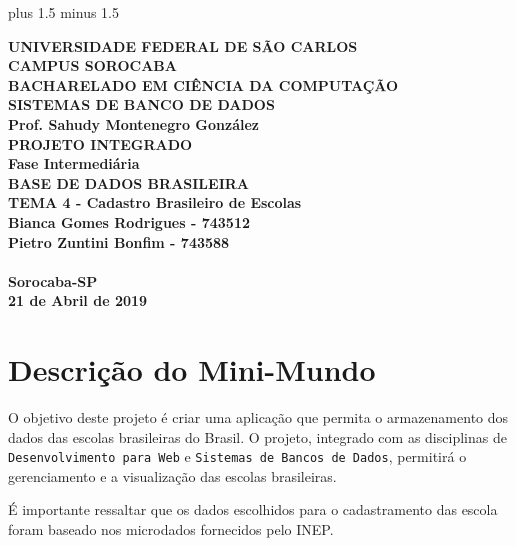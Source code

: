\documentclass[12pt,a4paper]{article}
\begin{document}
\font plus 1.5\font
minus 1.5\font

\begin{titlepage}

\begin{center}

\textbf{UNIVERSIDADE FEDERAL DE SÃO CARLOS\\CAMPUS SOROCABA\\\vspace{3cm} BACHARELADO EM CIÊNCIA DA COMPUTAÇÃO\\\vspace{3cm}SISTEMAS DE BANCO DE DADOS\\
Prof. Sahudy Montenegro González\\\vspace{3cm}
PROJETO INTEGRADO\\Fase Intermediária\\\vspace{0.5cm}
BASE DE DADOS BRASILEIRA\\TEMA 4 - Cadastro Brasileiro de Escolas \\\vspace{4.0cm}
Bianca Gomes Rodrigues - 743512\\
Pietro Zuntini Bonfim - 743588\\
\\\vspace{3.5cm}
Sorocaba-SP\\21 de Abril de 2019}

\end{center}

\end{titlepage}


\pagebreak
\renewcommand*\contentsname{Índice}
\tableofcontents
\pagebreak

\section{Descrição do Mini-Mundo}

O objetivo deste projeto é criar uma aplicação que permita o armazenamento dos dados das escolas brasileiras do Brasil. O projeto, integrado com as disciplinas de \texttt{Desenvolvimento para Web} e \texttt{Sistemas de Bancos de Dados}, permitirá o gerenciamento e a visualização das escolas brasileiras.

\begin{info}
É importante ressaltar que os dados escolhidos para o cadastramento das escola foram baseado nos microdados fornecidos pelo INEP.
\end{info}
\end{document}
